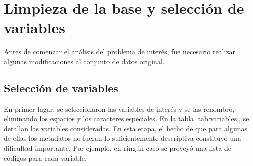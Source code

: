 \documentclass[
]{article}
\begin{document}
\hypertarget{limpieza-de-la-base-y-selecciuxf3n-de-variables}{%
\section{\texorpdfstring{Limpieza de la base y selección de variables
\label{limpieza}}{Limpieza de la base y selección de variables }}\label{limpieza-de-la-base-y-selecciuxf3n-de-variables}}

Antes de comenzar el análisis del problema de interés, fue necesario
realizar algunas modificaciones al conjunto de datos original.

\hypertarget{selecciuxf3n-de-variables}{%
\subsection{\texorpdfstring{Selección de variables
\label{seleccion_variables}}{Selección de variables }}\label{selecciuxf3n-de-variables}}

En primer lugar, se seleccionaron las variables de interés y se las
renombró, eliminando los espacios y los caracteres especiales. En la
tabla \ref{tab:variables}, se detallan las variables consideradas. En
esta etapa, el hecho de que para algunas de ellas los metadatos no
fueran lo suficientemente descriptiva constituyó una dificultad
importante. Por ejemplo, en ningún caso se proveyó una lista de códigos
para cada variable.
\end{document}
